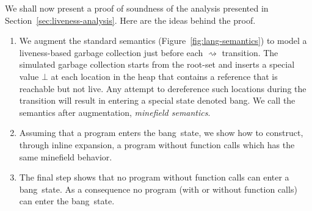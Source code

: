 \documentclass[preprint,9pt]{sigplanconf}
\newcommand{\warning}[1]{{\color{Myred}{#1}}}
\newcommand{\cred}[1]{\psframebox[linestyle=none, fillcolor=lightgray,fillstyle=solid,framesep=0.5pt]{#1}}
\newcommand{\bang}{\mbox{\sc bang}}
\begin{document}


We shall now present a proof of soundness of the analysis presented in
Section~\ref{sec:liveness-analysis}.  %
Here are
the ideas behind the proof.
\begin{enumerate}
\item       We   augment     the        standard       semantics
  (Figure~\ref{fig:lang-semantics}) to model  a liveness-based garbage
  collection  just  before  each  $\rightsquigarrow$  transition.  The
  simulated garbage collection starts from  the root-set and inserts a
  special value  $\bot$ at each location  in the heap that  contains a
  reference that is reachable but not live. Any attempt to dereference
  such  locations during  the  transition will  result  in entering  a
  special state denoted \bang. We call the semantics after
  augmentation,  \emph{minefield semantics}.
\item \label{inline1} Assuming that a  program enters the \bang\ state,
  we  show  how to  construct,  through  inline expansion,  a  program
  without function calls which has the same minefield behavior.
\item  The final  step   shows  that  no program  without
  function calls can enter a \bang\ state. As a consequence no program
  (with or without function calls) can enter the \bang\ state. 
\end{enumerate}
\end{document}
